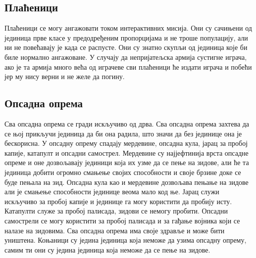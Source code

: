 \documentclass[11pt,a4paper]{report}
\begin{document}
\subsection{Плаћеници}
Плаћеници се могу ангажовати током интерактивних мисија. Они су сачињени од јединица прве класе у предодређеним пропорцијама и не троше популацију, али ни не повећавају је када се распусте. Они су знатно скупљи од јединица које би биле нормално ангажоване. У случају да непријатељска армија сустигне играча, ако је та армија много већа од играчеве сви плаћеници ће издати играча и побећи јер му нису верни и не желе да погину.

\subsection{Опсадна опрема}
Сва опсадна опрема се гради искључиво од дрва. Сва опсадна опрема захтева да се њој прикључи јединица да би она радила, што значи да без јединице она је бескорисна. У опсадну опрему спадају мердевине, опсадна кула, јарац за пробој капије, катапулт и  опсадни самострел. Мердевине су најјефтинија врста опсадне опреме и оне дозвољавају јединици која их узме да се пење на зидове, али ће та јединица добити огромно смањење својих способности и своје брзине доке се буде пењала на зид. Опсадна кула као и мердевине дозвољава пењање на зидове али је смањење способности јединице веома мало код ње. Јарац служи искључиво за пробој капије и јединице га могу користити да пробију исту. Катапулти служе за пробој палисада, зидови се немогу пробити. Опсадни самострели се могу користити за пробој палисада и за гађање војника који се налазе на зидовима. Сва опсадна опрема има своје здравље и може бити уништена. Коњаници су једина јединица која неможе да узима опсадну опрему, самим ти они су једина јединица која неможе да се пење на зидове.
\end{document}

